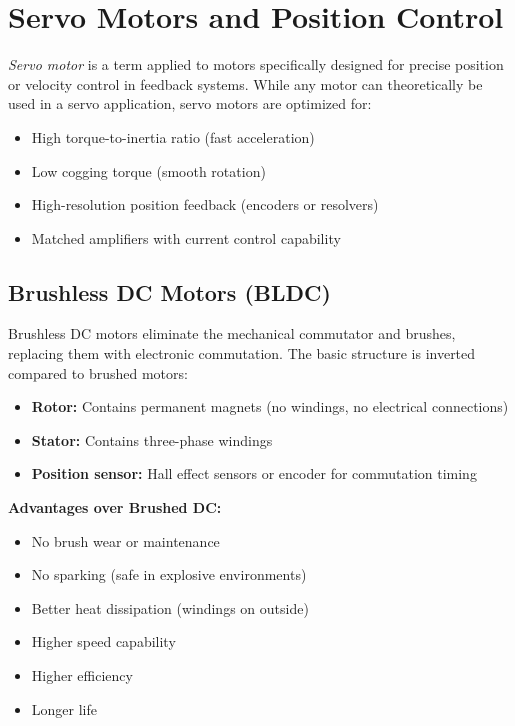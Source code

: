 \section{Servo Motors and Position Control}
\label{sec:servo_motors}

\textit{Servo motor} is a term applied to motors specifically designed for precise position or velocity control in feedback systems. While any motor can theoretically be used in a servo application, servo motors are optimized for:
\begin{itemize}
    \item High torque-to-inertia ratio (fast acceleration)
    \item Low cogging torque (smooth rotation)
    \item High-resolution position feedback (encoders or resolvers)
    \item Matched amplifiers with current control capability
\end{itemize}

\subsection{Brushless DC Motors (BLDC)}

Brushless DC motors eliminate the mechanical commutator and brushes, replacing them with electronic commutation. The basic structure is inverted compared to brushed motors:
\begin{itemize}
    \item \textbf{Rotor:} Contains permanent magnets (no windings, no electrical connections)
    \item \textbf{Stator:} Contains three-phase windings
    \item \textbf{Position sensor:} Hall effect sensors or encoder for commutation timing
\end{itemize}

\textbf{Advantages over Brushed DC:}
\begin{itemize}
    \item No brush wear or maintenance
    \item No sparking (safe in explosive environments)
    \item Better heat dissipation (windings on outside)
    \item Higher speed capability
    \item Higher efficiency
    \item Longer life
\end{itemize}

